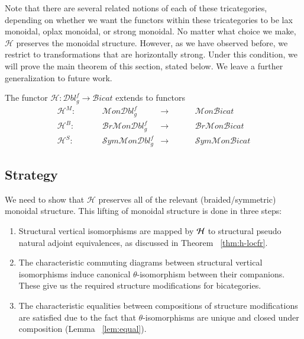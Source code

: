 \documentclass{amsart}
\begin{document}
Note that there are several related notions of each of these tricategories, depending on whether we want the functors within these tricategories to be lax monoidal, oplax monoidal, or strong monoidal. No matter what choice we make, $\mathcal{H}$ preserves the monoidal structure. However, as we have observed before, we restrict to transformations that are horizontally strong. Under this condition, we will prove the main theorem of this section, stated below. We leave a further generalization to future work.

\begin{thm}\label{thm:trifunctor2}
The functor $\mathcal{H}: \mathcal{D}bl^f_g \rightarrow \mathcal{B}icat$ extends to functors 
\begin{align}
\mathcal{H}^M: \hspace{1cm} &\mathcal{M}on\mathcal{D}bl^f_g &\rightarrow \hspace{1cm} &\mathcal{M}on\mathcal{B}icat\\
\mathcal{H}^{B}: \hspace{1cm} &\mathcal{B}r\mathcal{M}on \mathcal{D}bl^f_g &\rightarrow \hspace{1cm} &\mathcal{B}r\mathcal{M}on\mathcal{B}icat\\ 
 \mathcal{H}^{S}: \hspace{1cm} &\mathcal{S}ym\mathcal{M}on\mathcal{D}bl^f_g &\rightarrow \hspace{1cm} &\mathcal{S}ym \mathcal{M}on\mathcal{B}icat
\end{align} 
\end{thm}

\subsection{Strategy}
We need to show that $\mathcal{H}$ preserves all of the relevant (braided/symmetric) monoidal structure.
This lifting of monoidal structure is done in three steps:
\begin{enumerate}
\item Structural vertical isomorphisms are mapped by $\mathcal{H}$ to structural pseudo natural adjoint equivalences, as discussed in Theorem ~\ref{thm:h-locfr}.
\item The characteristic commuting diagrams between structural vertical isomorphisms induce canonical $\theta$-isomorphism between their companions. These give us the required structure modifications for bicategories.
\item The characteristic equalities between compositions of structure modifications are satisfied due to the fact that $\theta$-isomorphisms are unique and closed under composition (Lemma ~\ref{lem:equal}).
\end{enumerate}
\end{document}
